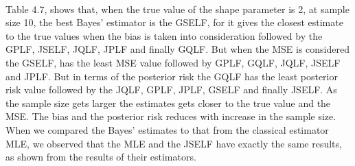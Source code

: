 \documentclass[a4paper,12pt]{report}
\begin{document}
\begin{minipage}{\linewidth}
		
\end{minipage}
\\ \vspace{1cm}


\indent Table 4.7, shows that, when the true value of the shape parameter is 2, at sample size 10, the best Bayes’ estimator is the GSELF, for it gives the closest estimate to the true values when the bias is taken into consideration followed by the GPLF, JSELF, JQLF, JPLF and finally GQLF. But when the MSE is considered the GSELF, has the least MSE value followed by GPLF, GQLF, JQLF, JSELF and JPLF. But in terms of the posterior risk  the GQLF has the least posterior risk value followed by the JQLF, GPLF, JPLF, GSELF and finally JSELF.
As the sample size gets larger the estimates gets closer to the true value and the MSE. The bias and the posterior risk reduces with increase in the sample size. When we compared the Bayes’ estimates to that from the classical estimator MLE, we observed that the MLE and the JSELF have exactly the same results, as shown from the results of their estimators.\\
\end{document}
